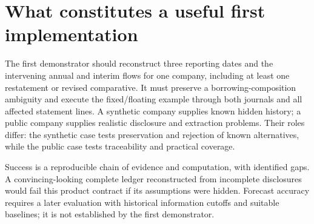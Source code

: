 \clearpage
\section{What constitutes a useful first implementation}

The first demonstrator should reconstruct three reporting dates and the
intervening annual and interim flows for one company, including at least one
restatement or revised comparative. It must preserve a borrowing-composition
ambiguity and execute the fixed/floating example through both journals and all
affected statement lines. A synthetic company supplies known hidden history;
a public company supplies realistic disclosure and extraction problems. Their
roles differ: the synthetic case tests preservation and rejection of known
alternatives, while the public case tests traceability and practical coverage.

Success is a reproducible chain of evidence and computation, with identified
gaps. A convincing-looking complete ledger reconstructed from incomplete
disclosures would fail this product contract if its assumptions were hidden.
Forecast accuracy requires a later evaluation with historical information
cutoffs and suitable baselines; it is not established by the first demonstrator.
